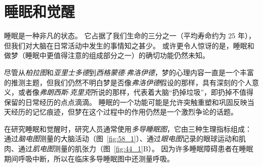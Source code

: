 \chapter{睡眠和觉醒} \label{chap:chap44}

睡眠是一种非凡的状态。
它占据了我们生命的三分之一（平均寿命约为 25 年），但我们对大脑在日常活动中发生的事情知之甚少。
或许更令人惊讶的是，睡眠和做梦（睡眠中更值得注意的组成部分之一）的确切功能仍然未知。


尽管从\textit{柏拉图}和\textit{亚里士多德}到\textit{西格蒙德$\cdot$弗洛伊德}，梦的心理内容一直是一个丰富的推测主题，但我们仍然不明白梦是否像\textit{弗洛伊德}假设的那样，具有深刻的个人意义，或者像\textit{弗朗西斯$\cdot$克里克}所说的那样，代表着大脑“扔掉垃圾”，即扔掉不值得保留的日常经历的点点滴滴。
睡眠的一个功能可能是允许突触重塑和巩固反映当天经历的记忆痕迹，但梦在这个过程中的作用仍然是一个激烈争论的话题。


在研究睡眠和觉醒时，研究人员通常使用\textit{多导睡眠图}，它由三种生理指标组成：
通过\textit{脑电图}测量的大脑活动（图~\ref{fig:58_1}）、通过\textit{眼电图}记录的眼球运动和肌肉、通过\textit{肌电图}测量的肌张力（图~\ref{fig:44_1}B）。
因为许多睡眠障碍患者在睡眠期间呼吸中断，所以在临床多导睡眠图中还测量呼吸。


